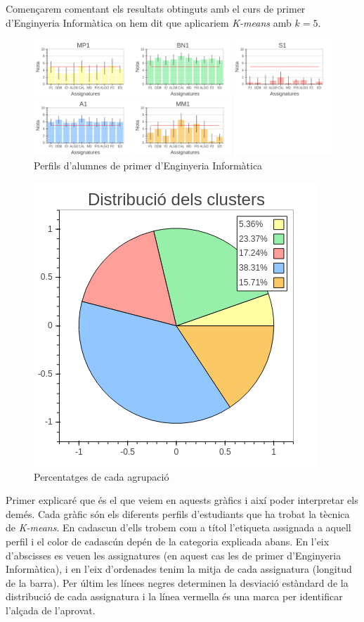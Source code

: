 \documentclass[12pt,a4paper,catalan]{article}
\begin{document}
\newpage

Començarem comentant els resultats obtinguts amb el curs de primer d'Enginyeria Informàtica on hem dit que aplicariem \textit{K-means} amb $k=5$.

\begin{figure}[h]
\centering
\includegraphics[width=\linewidth]{img/perfils_primer_info.png}
\caption{Perfils d'alumnes de primer d'Enginyeria Informàtica}
\end{figure}

\begin{figure}[h]
\centering
\includegraphics[width=.55\linewidth]{img/perfils_primer_info_pastilla.png}
\caption{Percentatges de cada agrupació}
\label{fig:pasprimerinfo}
\end{figure}

Primer explicaré que és el que veiem en aquests gràfics i així poder interpretar els demés. Cada gràfic són els diferents perfils d'estudiants que ha trobat la tècnica de \textit{K-means}. En cadascun d'ells trobem com a títol l'etiqueta assignada a aquell perfil i el color de cadascún depén de la categoria explicada abans. En l'eix d'abscisses es veuen les assignatures (en aquest cas les de primer d'Enginyeria Informàtica), i en l'eix d'ordenades tenim la mitja de cada assignatura (longitud de la barra). Per últim les línees negres determinen la desviació estàndard de la distribució de cada assignatura i la línea vermella és una marca per identificar l'alçada de l'aprovat.
\end{document}
